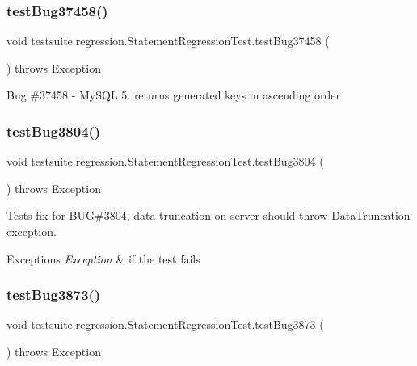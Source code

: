 \subsubsection{\texorpdfstring{test\+Bug37458()}{testBug37458()}}
{\footnotesize\ttfamily void testsuite.\+regression.\+Statement\+Regression\+Test.\+test\+Bug37458 (\begin{DoxyParamCaption}{ }\end{DoxyParamCaption}) throws Exception}

Bug \#37458 -\/ My\+S\+QL 5. returns generated keys in ascending order \mbox{\label{classtestsuite_1_1regression_1_1_statement_regression_test_aa50b1c76440598f989c311efbcc037df}} 
\subsubsection{\texorpdfstring{test\+Bug3804()}{testBug3804()}}
{\footnotesize\ttfamily void testsuite.\+regression.\+Statement\+Regression\+Test.\+test\+Bug3804 (\begin{DoxyParamCaption}{ }\end{DoxyParamCaption}) throws Exception}

Tests fix for B\+UG\#3804, data truncation on server should throw Data\+Truncation exception.


\begin{DoxyExceptions}{Exceptions}
{\em Exception} & if the test fails \\
\hline
\end{DoxyExceptions}
\mbox{\label{classtestsuite_1_1regression_1_1_statement_regression_test_ae2a11a2595f18543149eec103cbdab74}} 
\subsubsection{\texorpdfstring{test\+Bug3873()}{testBug3873()}}
{\footnotesize\ttfamily void testsuite.\+regression.\+Statement\+Regression\+Test.\+test\+Bug3873 (\begin{DoxyParamCaption}{ }\end{DoxyParamCaption}) throws Exception}

